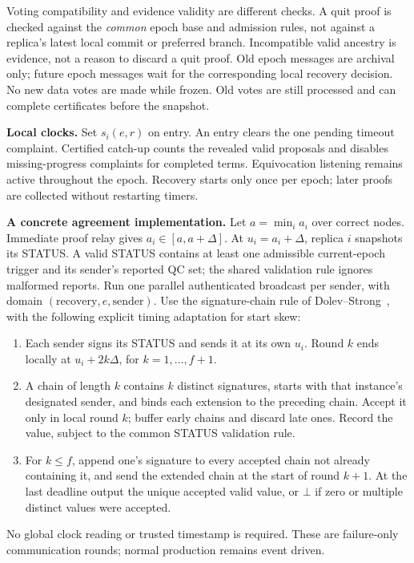\documentclass[10pt,a4paper]{article}
\begin{document}
Voting compatibility and evidence validity are different checks. A quit
proof is checked against the \emph{common} epoch base and admission rules,
not against a replica's latest local commit or preferred branch. Incompatible
valid ancestry is evidence, not a reason to discard a quit proof. Old epoch
messages are archival only; future epoch messages wait for the corresponding
local recovery decision. No new data votes are made while frozen. Old votes
are still processed and can complete certificates before the snapshot.

\textbf{Local clocks.} Set $s_i(e,r)$ on entry. An entry clears the one
pending timeout complaint. Certified catch-up counts the revealed valid
proposals and disables missing-progress complaints for completed terms.
Equivocation listening remains active throughout the epoch. Recovery starts
only once per epoch; later proofs are collected without restarting timers.

\textbf{A concrete agreement implementation.} Let $a=\min_i a_i$ over correct
nodes. Immediate proof relay gives $a_i\in[a,a+\Delta]$. At
$u_i=a_i+\Delta$, replica $i$ snapshots its STATUS. A valid STATUS contains
at least one admissible current-epoch trigger and its sender's reported QC
set; the shared validation rule ignores malformed reports. Run one parallel
authenticated broadcast per sender, with domain $(\text{recovery},e,\text{sender})$.
Use the signature-chain rule of Dolev--Strong~\cite{ds}, with the following
explicit timing adaptation for start skew:
\begin{enumerate}[label=\arabic*.,itemsep=3pt]
\item Each sender signs its STATUS and sends it at its own $u_i$. Round $k$
ends locally at $u_i+2k\Delta$, for $k=1,\ldots,f+1$.
\item A chain of length $k$ contains $k$ distinct signatures, starts with
that instance's designated sender, and binds each extension to the preceding
chain. Accept it only in local round $k$; buffer early chains and discard
late ones. Record the value, subject to the common STATUS validation rule.
\item For $k\le f$, append one's signature to every accepted chain not
already containing it, and send the extended chain at the start of round
$k+1$. At the last deadline output the unique accepted valid value, or
$\bot$ if zero or multiple distinct values were accepted.
\end{enumerate}
No global clock reading or trusted timestamp is required. These are
failure-only communication rounds; normal production remains event driven.
\end{document}
